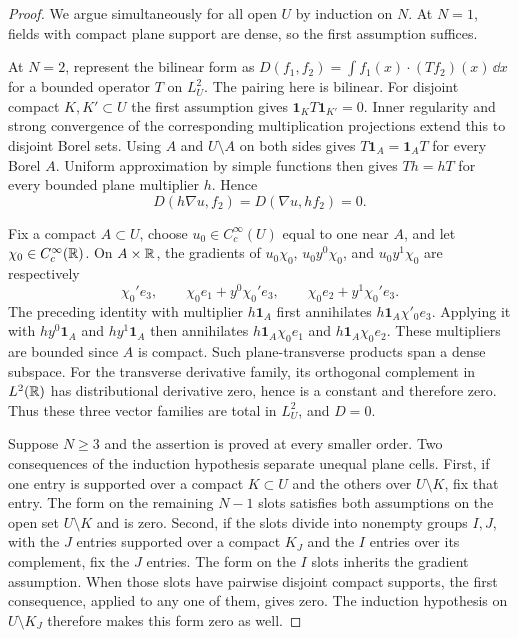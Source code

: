 \begin{proof}
We argue simultaneously for all open $U$ by induction on $N$.
At $N=1$, fields with compact plane support are dense, so the
first assumption suffices.

At $N=2$, represent the bilinear form as
$D(f_1,f_2)=\int f_1(x)\cdot(Tf_2)(x)\,\dd x$ for a bounded
operator $T$ on $L^2_U$. The pairing here is bilinear.
For disjoint compact $K,K'\subset U$ the first assumption gives
$\mathbf1_KT\mathbf1_{K'}=0$.
Inner regularity and strong convergence of the corresponding
multiplication projections extend this to disjoint Borel sets.
Using $A$ and $U\setminus A$ on both sides gives
$T\mathbf1_A=\mathbf1_AT$ for every Borel $A$.
Uniform approximation by simple functions then gives $Th=hT$
for every bounded plane multiplier $h$. Hence
\[
 D(h\nabla u,f_2)=D(\nabla u,hf_2)=0.
\]

Fix a compact $A\subset U$, choose $u_0\in C_c^\infty(U)$ equal
to one near $A$, and let $\chi_0\in C_c^\infty(\mathbb R)$.
On $A\times\mathbb R$, the gradients of
$u_0\chi_0$, $u_0y^0\chi_0$, and $u_0y^1\chi_0$ are respectively
\[
 \chi_0'e_3,\qquad
 \chi_0e_1+y^0\chi_0'e_3,\qquad
 \chi_0e_2+y^1\chi_0'e_3.
\]
The preceding identity with multiplier $h\mathbf1_A$ first
annihilates $h\mathbf1_A\chi'_0e_3$.
Applying it with $hy^0\mathbf1_A$ and $hy^1\mathbf1_A$ then
annihilates $h\mathbf1_A\chi_0e_1$ and
$h\mathbf1_A\chi_0e_2$. These multipliers are bounded since $A$
is compact. Such plane-transverse products span a dense subspace.
For the transverse derivative family, its orthogonal complement
in $L^2(\mathbb R)$ has distributional derivative zero, hence is a
constant and therefore zero. Thus these three vector families
are total in $L^2_U$, and $D=0$.

Suppose $N\ge3$ and the assertion is proved at every smaller order.
Two consequences of the induction hypothesis separate unequal
plane cells. First, if one entry is supported over a compact
$K\subset U$ and the others over $U\setminus K$, fix that entry.
The form on the remaining $N-1$ slots satisfies both assumptions
on the open set $U\setminus K$ and is zero.
Second, if the slots divide into nonempty groups $I,J$, with
the $J$ entries supported over a compact $K_J$ and the $I$
entries over its complement, fix the $J$ entries.
The form on the $I$ slots inherits the gradient assumption.
When those slots have pairwise disjoint compact supports, the
first consequence, applied to any one of them, gives zero.
The induction hypothesis on $U\setminus K_J$ therefore makes
this form zero as well.


\end{proof}
